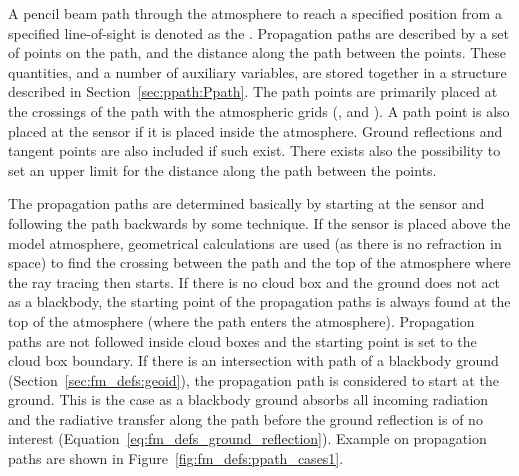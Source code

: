 \label{sec:fm_defs:ppaths}

A pencil beam path through the atmosphere to reach a specified
position from a specified line-of-sight is denoted as the
. Propagation paths are described by a set
of points on the path, and the distance along the path between the
points. These quantities, and a number of auxiliary variables, are
stored together in a structure described in
Section~\ref{sec:ppath:Ppath}. The path points are primarily placed at
the crossings of the path with the atmospheric grids
(,  and
). A path point is also placed at the sensor if
it is placed inside the atmosphere.  Ground reflections and tangent
points are also included if such exist.  There exists also the
possibility to set an upper limit for the distance along the path
between the points.

The propagation paths are determined basically by starting at the
sensor and following the path backwards by some 
technique. If the sensor is placed above the model atmosphere,
geometrical calculations are used (as there is no refraction in space)
to find the crossing between the path and the top of the atmosphere
where the ray tracing then starts. If there is no cloud box and the
ground does not act as a blackbody, the starting point of the propagation
paths is always found at the top of the atmosphere (where the path
enters the atmosphere). Propagation paths are not followed inside
cloud boxes and the starting point is set to the cloud box boundary.
If there is an intersection with path of a blackbody ground
(Section~\ref{sec:fm_defs:geoid}), the propagation path is considered
to start at the ground. This is the case as a blackbody ground absorbs
all incoming radiation and the radiative transfer along the path
before the ground reflection is of no interest
(Equation~\ref{eq:fm_defs_ground_reflection}). Example on propagation
paths are shown in Figure~\ref{fig:fm_defs:ppath_cases1}.

